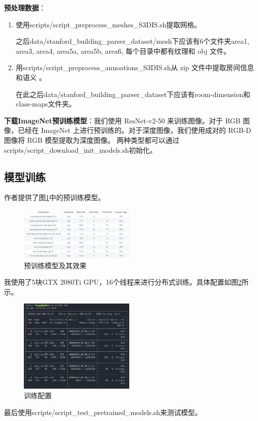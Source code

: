 \documentclass{thuemp}
\begin{document}
\textbf{预处理数据}：
\begin{enumerate}
  \item 使用scripts/script\_preprocess\_meshes\_S3DIS.sh提取网格。

  之后data/stanford\_building\_parser\_dataset/mesh下应该有6个文件夹area1, area3, area4, area5a, area5b, area6, 每个目录中都有纹理和 obj 文件。
  \item 用scripts/script\_preprocess\_annoations\_S3DIS.sh从 zip 文件中提取房间信息和语义 。
  
  在此之后data/stanford\_building\_parser\_dataset下应该有room-dimension和class-maps文件夹。
\end{enumerate}

\textbf{下载ImageNet预训练模型}：我们使用 ResNet-v2-50 来训练图像。对于 RGB 图像，已经在 ImageNet 上进行预训练的。对于深度图像，我们使用成对的 RGB-D 图像将 RGB 模型提取为深度图像。
两种类型都可以通过 scripts/script\_download\_init\_models.sh初始化。
\subsection{模型训练}
作者提供了图\ref{fig:pretrained_models}中的预训练模型。
\begin{figure}[h]
  \centering
  \includegraphics[width=0.5\textwidth]{image/6.png}
  \caption{预训练模型及其效果}
  \label{fig:pretrained_models}
\end{figure}
我使用了5块GTX 2080Ti GPU，16个线程来进行分布式训练。具体配置如图\ref{fig:train}所示。
\begin{figure}[h]
  \centering
  \includegraphics[width=0.5\textwidth]{image/7.jpg}
  \caption{训练配置} 
  \label{fig:train}
\end{figure}
最后使用scripts/script\_test\_pretrained\_models.sh来测试模型。
\end{document}
